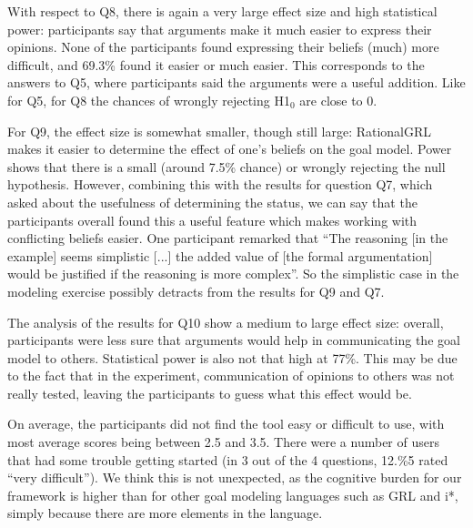 With respect to Q8, there is again a very large effect size and high statistical power: participants say that arguments make it much easier to express their opinions. None of the participants found expressing their beliefs (much) more difficult, and 69.3\% found it easier or much easier. This corresponds to the answers to Q5, where participants said the arguments were a useful addition. Like for Q5, for Q8 the chances of wrongly rejecting H1$_{0}$ are close to 0. 

For Q9, the effect size is somewhat smaller, though still large: RationalGRL makes it easier to determine the effect of one's beliefs on the goal model. Power shows that there is a small (around 7.5\% chance) or wrongly rejecting the null hypothesis. However, combining this with the results for question Q7, which asked about the usefulness of determining the status, we can say that the participants overall found this a useful feature which makes working with conflicting beliefs easier. One participant remarked that ``The reasoning [in the example] seems simplistic [...] the added value of [the formal argumentation] would be justified if the reasoning is more complex''. So the simplistic case in the modeling exercise possibly detracts from the results for Q9 and Q7.

The analysis of the results for Q10 show a medium to large effect size: overall, participants were less sure that arguments would help in communicating the goal model to others. Statistical power is also not that high at 77\%. This may be due to the fact that in the experiment, communication of opinions to others was not really tested, leaving the participants to guess what this effect would be.  

On average, the participants did not find the tool easy or difficult to use, with most average scores being between 2.5 and 3.5. There were a number of users that had some trouble getting started (in 3 out of the 4 questions, 12.\%5 rated ``very difficult''). We think this is not unexpected, as the cognitive burden for our framework is higher than for other goal modeling languages such as GRL and i*, simply because there are more elements in the language. 

